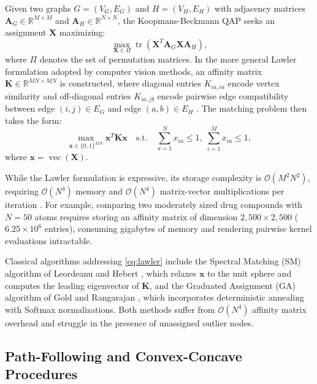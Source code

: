 \documentclass[conference]{IEEEtran}
\begin{document}
Given two graphs $G = (V_G, E_G)$ and $H = (V_H, E_H)$ with adjacency matrices $\mathbf{A}_G \in \mathbb{R}^{M \times M}$ and $\mathbf{A}_H \in \mathbb{R}^{N \times N}$, the Koopmans-Beckmann QAP seeks an assignment $\mathbf{X}$ maximizing:
\begin{equation}
\max_{\mathbf{X} \in \Pi} \operatorname{tr}(\mathbf{X}^T \mathbf{A}_G \mathbf{X} \mathbf{A}_H),
\label{eq:koopmans}
\end{equation}
where $\Pi$ denotes the set of permutation matrices. In the more general Lawler formulation adopted by computer vision methods, an affinity matrix $\mathbf{K} \in \mathbb{R}^{MN \times MN}$ is constructed, where diagonal entries $K_{ia, ia}$ encode vertex similarity and off-diagonal entries $K_{ia, jb}$ encode pairwise edge compatibility between edge $(i, j) \in E_G$ and edge $(a, b) \in E_H$ \cite{leordeanu2005, gold1996}. The matching problem then takes the form:
\begin{equation}
\max_{\mathbf{x} \in \{0, 1\}^{MN}} \mathbf{x}^T \mathbf{K} \mathbf{x} \quad \text{s.t.} \quad \sum_{a=1}^N x_{ia} \leq 1, \; \sum_{i=1}^M x_{ia} \leq 1,
\label{eq:lawler}
\end{equation}
where $\mathbf{x} = \operatorname{vec}(\mathbf{X})$.

While the Lawler formulation is expressive, its storage complexity is $\mathcal{O}(M^2 N^2)$, requiring $\mathcal{O}(N^4)$ memory and $\mathcal{O}(N^4)$ matrix-vector multiplications per iteration \cite{zaslavskiy2009}. For example, comparing two moderately sized drug compounds with $N = 50$ atoms requires storing an affinity matrix of dimension $2,500 \times 2,500$ ($6.25 \times 10^6$ entries), consuming gigabytes of memory and rendering pairwise kernel evaluations intractable.

Classical algorithms addressing \eqref{eq:lawler} include the Spectral Matching (SM) algorithm of Leordeanu and Hebert \cite{leordeanu2005}, which relaxes $\mathbf{x}$ to the unit sphere and computes the leading eigenvector of $\mathbf{K}$, and the Graduated Assignment (GA) algorithm of Gold and Rangarajan \cite{gold1996}, which incorporates deterministic annealing with Softmax normalizations. Both methods suffer from $\mathcal{O}(N^4)$ affinity matrix overhead and struggle in the presence of unassigned outlier nodes.

\subsection{Path-Following and Convex-Concave Procedures}
\end{document}
